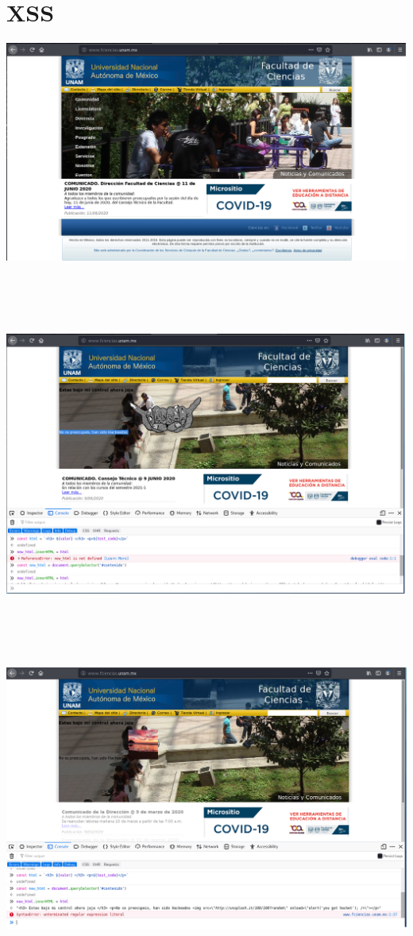 \documentclass[11pt,letterpaper]{article}
\begin{document}
\section{XSS}
\begin{center}
\includegraphics[scale=.4]{./Img/img0.png}
\end{center}~\\~\\~\\
\begin{center}
\includegraphics[scale=.4]{./Img/img1.png}
\end{center}~\\~\\~\\
\begin{center}
\includegraphics[scale=.4]{./Img/img2.png}
\end{center}~\\~\\~\\
\end{document}
